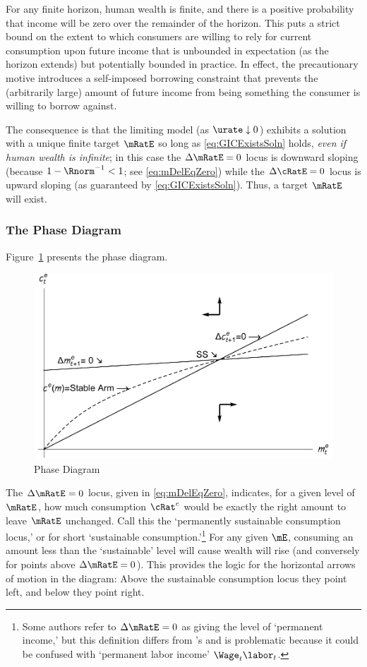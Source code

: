 \documentclass{handout}
\begin{document}
For any finite horizon, human wealth is finite, and there is a positive probability that income will be zero over the remainder of the horizon.  This puts a strict bound on the extent to which consumers are willing to rely for current consumption upon future income that is unbounded in expectation (as the horizon extends) but potentially bounded in practice.  In effect, the precautionary motive introduces a self-imposed borrowing constraint that prevents the (arbitrarily large) amount of future income from being something the consumer is willing to borrow against.

The consequence is that the limiting model (as $\urate \downarrow 0$) exhibits a solution with a unique finite target $\mRatE$ so long as \eqref{eq:GICExistsSoln} holds, {\it even if human wealth is infinite}; in this case the $\dmEqZero$ locus is downward sloping (because $1-\Rnorm^{-1}<1$; see \eqref{eq:mDelEqZero}) while the $\dcEqZero$ locus is upward sloping (as guaranteed by \eqref{eq:GICExistsSoln}).  Thus, a target $\mRatE$ will exist.

\subsubsection{The Phase Diagram}

Figure~\ref{fig:PhaseDiag} presents the phase diagram.
\begin{figure}
\caption{Phase Diagram}\label{fig:PhaseDiag}
\includegraphics[width=6in]{../Figures/TractableBufferStockPhaseDiag}
\end{figure}


The $\Delta \mRatE_{\tSS} = 0$ locus, given in \eqref{eq:mDelEqZero},
indicates, for a given level of $\mRatE_{\tSS}$, how much consumption
${\cRat}^{e}_{\tSS}$ would be exactly the right amount to leave $\mRatE$
unchanged.  Call this the `permanently sustainable consumption locus,' or for short `sustainable consumption.'\footnote{Some authors refer to $\Delta \mRatE_{\tSS} = 0$ as giving the level of `permanent income,' but this definition differs from \cite{friedmanATheory}'s and is 
problematic because it could be confused with `permanent labor income' $\Wage_{t} \labor_{t}$.}  For any given $\mE$, consuming an amount less than the `sustainable' level will cause wealth will rise (and conversely for points above $\Delta \mRatE =0$).  This provides the logic for
the horizontal arrows of motion in the diagram: Above the sustainable consumption locus
they point left, and below they point right.
\end{document}
